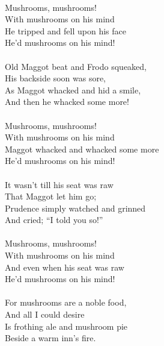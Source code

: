 \begin{multicols}{2}
\\
Mushrooms, mushrooms!
\\
With mushrooms on his mind
\\
He tripped and fell upon his face
\\
He’d mushrooms on his mind!
\\
\\
Old Maggot beat and Frodo squeaked,
\\
His backside soon was sore,
\\
As Maggot whacked and hid a smile,
\\
And then he whacked some more!
\\
\\
Mushrooms, mushrooms!
\\
With mushrooms on his mind
\\
Maggot whacked and whacked some more
\\
He’d mushrooms on his mind!
\\
\\
It wasn’t till his seat was raw
\\
That Maggot let him go;
\\
Prudence simply watched and grinned
\\
And cried; “I told you so!”
\\
\\
Mushrooms, mushrooms!
\\
With mushrooms on his mind
\\
And even when his seat was raw
\\
He’d mushrooms on his mind!
\\
\\
For mushrooms are a noble food,
\\
And all I could desire
\\
Is frothing ale and mushroom pie
\\
Beside a warm inn’s fire.

\end{multicols}